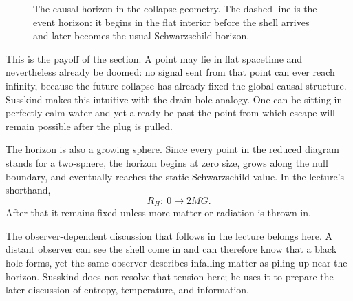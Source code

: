 \begin{figure}[ht]
\centering
{}
\caption{The causal horizon in the collapse geometry. The dashed line is the event horizon: it begins in the flat interior before the shell arrives and later becomes the usual Schwarzschild horizon.}
\end{figure}

This is the payoff of the section. A point may lie in flat spacetime and nevertheless already be doomed: no signal sent from that point can ever reach infinity, because the future collapse has already fixed the global causal structure. Susskind makes this intuitive with the drain-hole analogy. One can be sitting in perfectly calm water and yet already be past the point from which escape will remain possible after the plug is pulled.

The horizon is also a growing sphere. Since every point in the reduced diagram stands for a two-sphere, the horizon begins at zero size, grows along the null boundary, and eventually reaches the static Schwarzschild value. In the lecture's shorthand,
\begin{equation}
R_H:\ 0 \longrightarrow 2MG.
\end{equation}
After that it remains fixed unless more matter or radiation is thrown in.

\begin{remark}
The observer-dependent discussion that follows in the lecture belongs here. A distant observer can see the shell come in and can therefore know that a black hole forms, yet the same observer describes infalling matter as piling up near the horizon. Susskind does not resolve that tension here; he uses it to prepare the later discussion of entropy, temperature, and information.
\end{remark}

